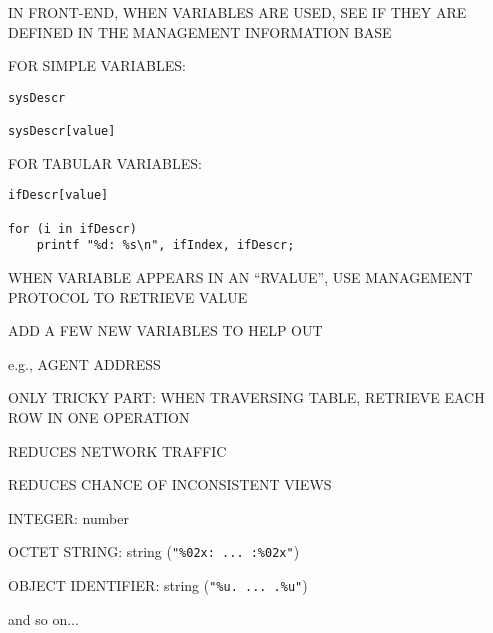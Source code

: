 \begin{bwslide}

\begin{nrtc}
\item	IN FRONT-END, WHEN VARIABLES ARE USED, SEE IF THEY ARE DEFINED
	IN THE MANAGEMENT INFORMATION BASE

\item	FOR SIMPLE VARIABLES:
\begin{verbatim}
sysDescr

sysDescr[value]
\end{verbatim}

\item	FOR TABULAR VARIABLES:
\begin{verbatim}
ifDescr[value]

for (i in ifDescr)
    printf "%d: %s\n", ifIndex, ifDescr;
\end{verbatim}
\end{nrtc}
\end{bwslide}


\begin{bwslide}

\begin{nrtc}
\item	WHEN VARIABLE APPEARS IN AN ``RVALUE'',
	USE MANAGEMENT PROTOCOL TO RETRIEVE VALUE

\item	ADD A FEW NEW VARIABLES TO HELP OUT
    \begin{nrtc}
    \item	e.g., AGENT ADDRESS
    \end{nrtc}

\item	ONLY TRICKY PART:
	WHEN TRAVERSING TABLE, RETRIEVE EACH ROW IN ONE OPERATION
    \begin{nrtc}
    \item	REDUCES NETWORK TRAFFIC

    \item	REDUCES CHANCE OF INCONSISTENT VIEWS
    \end{nrtc}
\end{nrtc}
\end{bwslide}


\begin{bwslide}

\begin{nrtc}
\item	INTEGER: number

\item	OCTET STRING: string (\verb|"%02x: ... :%02x"|)

\item	OBJECT IDENTIFIER: string (\verb|"%u. ... .%u"|)

\item	and so on$\ldots$
\end{nrtc}
\end{bwslide}


